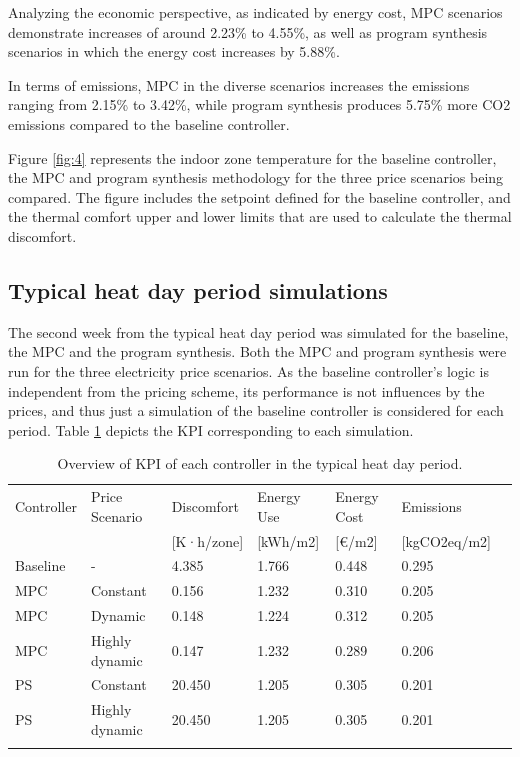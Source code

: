 Analyzing the economic perspective, as indicated by energy cost, MPC scenarios demonstrate increases of around 2.23\% to 4.55\%, as well as program synthesis scenarios in which the energy cost increases by 5.88\%. 

In terms of emissions, MPC in the diverse scenarios increases the emissions ranging from 2.15\% to 3.42\%, while program synthesis produces 5.75\% more CO2 emissions compared to the baseline controller.

Figure \ref{fig:4} represents the indoor zone temperature for the baseline controller, the MPC and program synthesis methodology for the three price scenarios being compared. The figure includes the setpoint defined for the baseline controller, and the thermal comfort upper and lower limits that are used to calculate the thermal discomfort.

\newpage
\subsection{Typical heat day period simulations}
\label{'results_typical'}
The second week from the typical heat day period was simulated for the baseline, the MPC and the program synthesis. Both the MPC and program synthesis were run for the three electricity price scenarios. As the baseline controller's logic is independent from the pricing scheme, its performance is not influences by the prices, and thus just a simulation of the baseline controller is considered for each period. Table \ref{tab:3} depicts the KPI corresponding to each simulation.

\begin{table}[H]
    \caption{Overview of KPI of each controller in the typical heat day period.}
    \label{tab:3}
    
    \centering
    \begin{tabular}{lllllll}
        \hline
        \noalign{\smallskip}
        Controller & Price Scenario & Discomfort & Energy Use & Energy Cost & Emissions  \\
        & & [K·h/zone] & [kWh/m2] & [€/m2] & [kgCO2eq/m2] \\
        \noalign{\smallskip}
        \hline
        \noalign{\smallskip}
        Baseline & - & 4.385 & 1.766 & 0.448 & 0.295 \\
        MPC & Constant & 0.156 & 1.232 & 0.310 & 0.205 \\
        MPC & Dynamic & 0.148 & 1.224 & 0.312 & 0.205 \\
        MPC & Highly dynamic & 0.147 & 1.232 & 0.289 & 0.206 \\
        PS & Constant & 20.450 & 1.205 & 0.305 & 0.201 \\
        PS & Highly dynamic & 20.450 & 1.205 & 0.305 & 0.201 \\
        \noalign{\smallskip}
        \hline
    \end{tabular}
\end{table}

